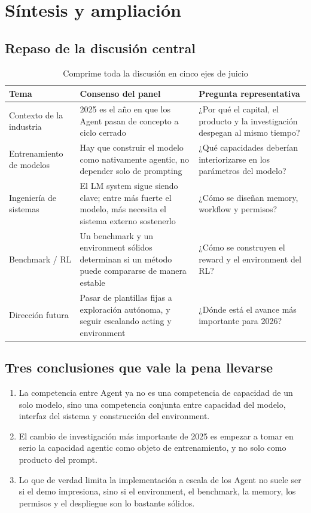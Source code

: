 \documentclass[a4paper]{article}
\begin{document}
\section{Síntesis y ampliación}

\subsection{Repaso de la discusión central}
\begin{table}[H]
\centering
\begin{tabular}{p{2.8cm}p{4.0cm}p{5.0cm}}
\toprule
\textbf{Tema} & \textbf{Consenso del panel} & \textbf{Pregunta representativa} \\
\midrule
Contexto de la industria & 2025 es el año en que los Agent pasan de concepto a ciclo cerrado & ¿Por qué el capital, el producto y la investigación despegan al mismo tiempo? \\
Entrenamiento de modelos & Hay que construir el modelo como nativamente agentic, no depender solo de prompting & ¿Qué capacidades deberían interiorizarse en los parámetros del modelo? \\
Ingeniería de sistemas & El LM system sigue siendo clave; entre más fuerte el modelo, más necesita el sistema externo sostenerlo & ¿Cómo se diseñan memory, workflow y permisos? \\
Benchmark / RL & Un benchmark y un environment sólidos determinan si un método puede compararse de manera estable & ¿Cómo se construyen el reward y el environment del RL? \\
Dirección futura & Pasar de plantillas fijas a exploración autónoma, y seguir escalando acting y environment & ¿Dónde está el avance más importante para 2026? \\
\bottomrule
\end{tabular}
\caption{Comprime toda la discusión en cinco ejes de juicio}
\end{table}

\subsection{Tres conclusiones que vale la pena llevarse}
\begin{enumerate}
  \item La competencia entre Agent ya no es una competencia de capacidad de un solo modelo, sino una competencia conjunta entre capacidad del modelo, interfaz del sistema y construcción del environment.
  \item El cambio de investigación más importante de 2025 es empezar a tomar en serio la capacidad agentic como objeto de entrenamiento, y no solo como producto del prompt.
  \item Lo que de verdad limita la implementación a escala de los Agent no suele ser si el demo impresiona, sino si el environment, el benchmark, la memory, los permisos y el despliegue son lo bastante sólidos.
\end{enumerate}
\end{document}
